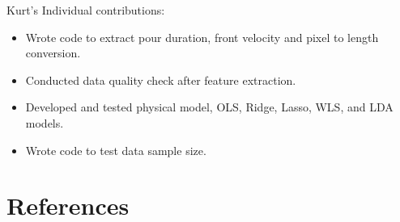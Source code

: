 \documentclass[twocolumn,10pt]{article}
\begin{document}
Kurt's Individual contributions:
\begin{itemize}
\item Wrote code to extract pour duration, front velocity and pixel to length conversion.
\item Conducted data quality check after feature extraction.
\item Developed and tested physical model, OLS, Ridge, Lasso, WLS, and LDA models.
\item Wrote code to test data sample size.  
\end{itemize}

\section{References} 
 

\end{document}
